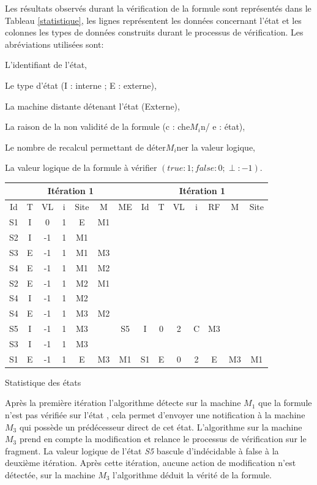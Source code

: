 Les résultats observés durant la vérification de la formule  sont repr\'{e}sent\'{e}s dans le Tableau \ref{statistique}, les lignes repr\'{e}sentent les donn\'{e}es concernant l'\'{e}tat et les colonnes les types de donn\'{e}es construits durant le processus de v\'{e}rification. Les abr\'{e}viations utilis\'{e}es sont:
\begin{description}[,leftmargin=2cm,labelindent=1em]
	\item[Id :] L'identifiant de l’état,
	\item[T  :] Le type d’\'{e}tat (I : interne ; E : externe),
	\item[Site :] La machine distante détenant l'\'{e}tat (Externe),
	\item[RF :] La raison de la non validit\'{e} de la formule (c : che$M_i$n/ e : \'{e}tat),
	\item[i :] Le nombre de recalcul permettant de d\'{e}ter$M_i$ner la valeur logique,
	\item[VL :] La valeur logique de la formule à vérifier $(true : 1 ; false : 0 ; \perp : -1)$.
\end{description}

\begin{tableth}
	\centering
	\begin{tabular}{|*{14}{c|}}
		\hline
		\multicolumn{7}{|c|}{It\'{e}ration 1}&\multicolumn{7}{|c|}{It\'{e}ration 1}\\
		\hline
		Id&	T	&VL&	i	&Site&	M&	ME&Id&	T	&VL&	i	&RF&	M&	Site\\
		\hline
		S1	&I	&0&	1	&E	&M1	&&&&&&&&\\
		\hline
		S2	&I	&-1&	1	&M1	&&&&&&&&&\\
		\hline
		S3	&E	&-1	&1		&M1	&M3&&&&&&&&\\
		\hline
		S4	&E	&-1	&1		&M1&	M2&&&&&&&&\\
		\hline
		S2& 	E	&-1	&1	&	M2&	M1&&&&&&&&\\
		\hline
		S4	&I&	-1	&1	&	M2	&&&&&&&&&\\
		\hline
		S4	&E	&-1&	1		&M3	&M2&&&&&&&&\\
		\hline
		S5	& I&	-1 &1	&	M3	&	&S5	&I	&0	&2&	C	&M3	&&\\
		\hline
		S3&	I	&-1	&1&		M3&&&&&&&&&\\
		\hline
		S1	&E	&-1	&1	&E	&M3&	M1&	S1	&E	&0	&2	&E	&M3&	M1\\
		\hline
	\end{tabular}
	\caption{Statistique des \'{e}tats}\label{statistique}
\end{tableth}

Apr\`{e}s la premi\`{e}re it\'{e}ration l'algorithme détecte sur la machine $M_1$ que la formule n’est pas v\'{e}rifi\'{e}e sur l’\'{e}tat , cela permet d'envoyer une notification à la machine $M_3$ qui possède un prédécesseur direct de cet \'{e}tat. L'algorithme sur la machine $M_3$  prend en compte la modification et relance le processus de v\'{e}rification sur le fragment. La valeur logique de l’\'{e}tat \emph{S5} bascule d'indécidable à false à la deuxi\`{e}me it\'{e}ration. Apr\`{e}s cette it\'{e}ration, aucune action de modification n'est détectée, sur la machine $M_3$ l'algorithme d\'{e}duit la v\'{e}rit\'{e} de la formule.